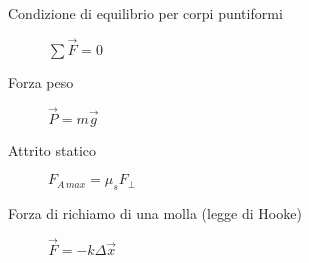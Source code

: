 \documentclass[a4paper,11pt,italian]{article}
\begin{document}
\begin{description}
  
  \item[Condizione di equilibrio per corpi puntiformi]
  $ \sum\vec{F} = 0 $
  
  \item[Forza peso] 
  $ \vec{P} = m \vec{g} $
  
  \item[Attrito statico] 
  
  $ F_{A \, max} = \mu_s F_\perp  $
  
  \item[Forza di richiamo di una molla (legge di Hooke)]
  $ \vec{F} = - k \Delta \vec{x} $
  
%   
\end{description}
\end{document}
